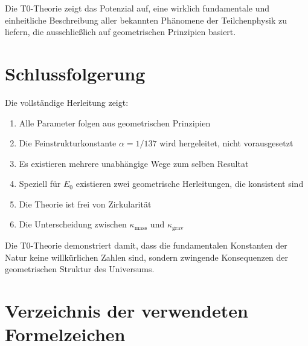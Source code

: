 Die T0-Theorie zeigt das Potenzial auf, eine wirklich fundamentale und einheitliche Beschreibung aller bekannten Phänomene der Teilchenphysik zu liefern, die ausschließlich auf geometrischen Prinzipien basiert.

	\section{Schlussfolgerung}
	
	Die vollständige Herleitung zeigt:
	\begin{enumerate}
		\item Alle Parameter folgen aus geometrischen Prinzipien
		\item Die Feinstrukturkonstante $\alpha = 1/137$ wird hergeleitet, nicht vorausgesetzt
		\item Es existieren mehrere unabhängige Wege zum selben Resultat
		\item Speziell für $E_0$ existieren zwei geometrische Herleitungen, die konsistent sind
		\item Die Theorie ist frei von Zirkularität
		\item Die Unterscheidung zwischen $\kappa_{\text{mass}}$ und $\kappa_{\text{grav}}$
	\end{enumerate}
	
	Die T0-Theorie demonstriert damit, dass die fundamentalen Konstanten der Natur keine willkürlichen Zahlen sind, sondern zwingende Konsequenzen der geometrischen Struktur des Universums.

\appendix
\section{Verzeichnis der verwendeten Formelzeichen}
\label{app:symbols_de}

